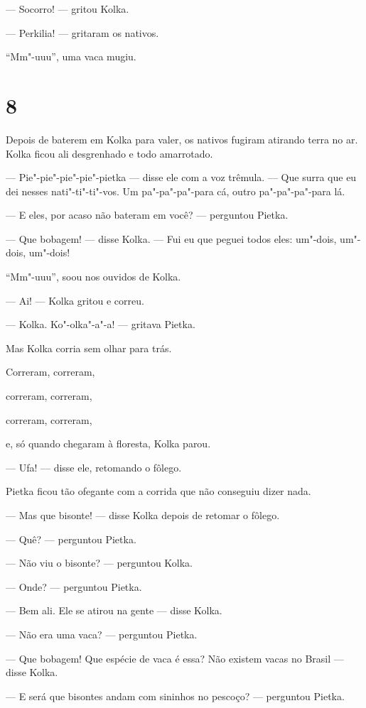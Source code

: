 --- Socorro! --- gritou Kolka.

--- Perkilia! --- gritaram os nativos.

``Mm"-uuu'', uma vaca mugiu.

\section{8}

Depois de baterem em Kolka para valer, os nativos fugiram atirando terra
no ar. Kolka ficou ali desgrenhado e todo amarrotado.

--- Pie"-pie"-pie"-pie"-pietka --- disse ele com a voz trêmula. --- Que
surra que eu dei nesses nati"-ti"-ti"-vos. Um pa"-pa"-pa"-para cá, outro
pa"-pa"-pa"-para lá.

--- E eles, por acaso não bateram em você? --- perguntou Pietka.

--- Que bobagem! --- disse Kolka. --- Fui eu que peguei todos eles:
um"-dois, um"-dois, um"-dois!

``Mm"-uuu'', soou nos ouvidos de Kolka.

--- Ai! --- Kolka gritou e correu.

--- Kolka. Ko"-olka"-a"-a! --- gritava Pietka.

Mas Kolka corria sem olhar para trás.

Correram, correram,

correram, correram,

correram, correram,

e, só quando chegaram à floresta, Kolka parou.

--- Ufa! --- disse ele, retomando o fôlego.

Pietka ficou tão ofegante com a corrida que não conseguiu dizer nada.

--- Mas que bisonte! --- disse Kolka depois de retomar o fôlego.

--- Quê? --- perguntou Pietka.

--- Não viu o bisonte? --- perguntou Kolka.

--- Onde? --- perguntou Pietka.

--- Bem ali. Ele se atirou na gente --- disse Kolka.

--- Não era uma vaca? --- perguntou Pietka.

--- Que bobagem! Que espécie de vaca é essa? Não existem vacas no Brasil
--- disse Kolka.

--- E será que bisontes andam com sininhos no pescoço? --- perguntou
Pietka.

